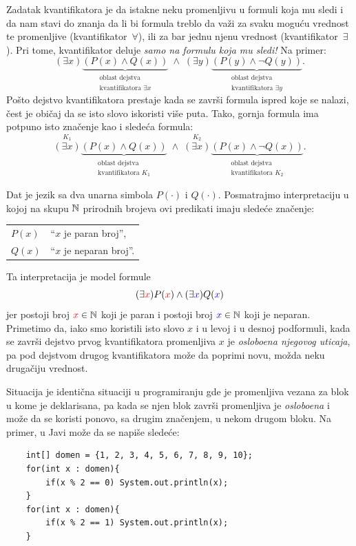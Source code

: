 Zadatak kvantifikatora je da istakne neku promenljivu u formuli koja mu sledi
i da nam stavi do znanja da li bi formula treblo da va\v zi za svaku mogu\'cu vrednost te promenljive
(kvantifikator~$\forall$), ili za bar jednu njenu vrednost (kvantifikator~$\exists$).
Pri tome, kvantifikator deluje \emph{samo na formulu koja mu sledi!}
Na primer:
$$
  (\exists x)\underbrace{(P(x) \land Q(x))}_{\substack{\text{oblast dejstva}\\\text{kvantifikatora $\exists x$}}} \; \land \;
  (\exists y)\underbrace{(P(y) \land \lnot Q(y))}_{\substack{\text{oblast dejstva}\\\text{kvantifikatora $\exists y$}}}.
$$
Po\v sto dejstvo kvantifikatora prestaje kada se zavr\v si formula ispred koje se nalazi, \v cest je
obi\v caj da se isto slovo iskoristi vi\v se puta. Tako, gornja formula ima potpuno isto zna\v cenje kao i
slede\'ca formula:
$$
  \overset{K_1}{(\exists x)} \underbrace{(P(x) \land Q(x))}_{\substack{\text{oblast dejstva}\\\text{kvantifikatora $K_1$}}} \; \land \;
  \overset{K_2}{(\exists x)} \underbrace{(P(x) \land \lnot Q(x))}_{\substack{\text{oblast dejstva}\\\text{kvantifikatora $K_2$}}}.
$$

\begin{EX}
  Dat je jezik sa dva unarna simbola $P(\cdot)$ i $Q(\cdot)$. Posmatrajmo interpretaciju
  u kojoj na skupu $\mathbb{N}$ prirodnih brojeva ovi predikati imaju slede\'ce zna\v cenje:

  \medskip

  \begin{tabular}{l@{\quad$\leadsto$\quad}l}
    $P(x)$ & \enquote{$x$ je paran broj},\\
    $Q(x)$ & \enquote{$x$ je neparan broj}.
  \end{tabular}
  
  \medskip

  \noindent
  Ta interpretacija je model formule
  $$
    (\exists \textcolor{red}{x})P(\textcolor{red}{x}) \land (\exists \textcolor{blue}{x})Q(\textcolor{blue}{x})
  $$
  jer postoji broj $\textcolor{red}{x} \in \mathbb{N}$ koji je paran i postoji broj
  $\textcolor{blue}{x} \in \mathbb{N}$ koji je neparan. Primetimo da, iako smo koristili isto slovo $x$
  i u levoj i u desnoj podformuli, kada se zavr\v si dejstvo prvog kvantifikatora promenljiva $x$ je
  \emph{oslobo\dj ena njegovog uticaja}, pa pod dejstvom drugog kvantifikatora mo\v ze da poprimi novu,
  mo\v zda neku druga\v ciju vrednost.

  Situacija je identi\v cna situaciji u programiranju gde je promenljiva vezana za blok u kome je deklarisana,
  pa kada se njen blok zavr\v si promenljiva je \emph{oslobo\dj ena} i mo\v ze da se koristi ponovo, sa drugim
  zna\v cenjem, u nekom drugom bloku. Na primer, u Javi mo\v ze da se napi\v se slede\'ce:
  \begin{verbatim}
    int[] domen = {1, 2, 3, 4, 5, 6, 7, 8, 9, 10};
    for(int x : domen){
        if(x % 2 == 0) System.out.println(x);
    }
    for(int x : domen){
        if(x % 2 == 1) System.out.println(x);
    }
  \end{verbatim}
\end{EX}


